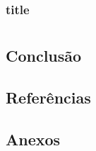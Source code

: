 \documentclass[12pt, a4paper]{book} %
\begin{document}
            \section[Comunicação do artefato aos \textit{stakeholders}]{title}


    \part*{}

        \chapter*{Conclusão}

        \chapter*{Referências}


        \chapter*{Anexos}
\end{document}
